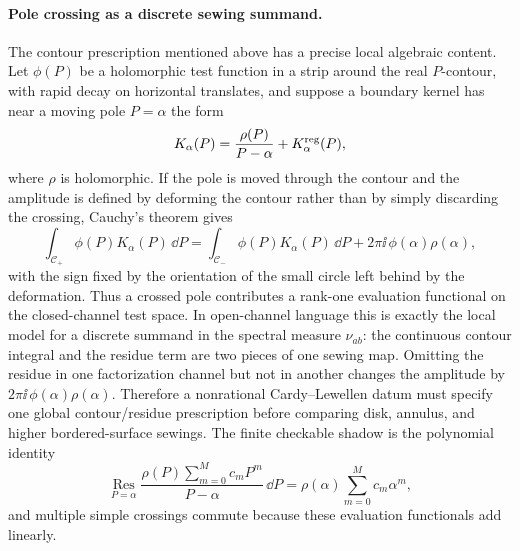 \paragraph{Pole crossing as a discrete sewing summand.}
The contour prescription mentioned above has a precise local algebraic
content.  Let \(\phi(P)\) be a holomorphic test function in a strip around the
real \(P\)-contour, with rapid decay on horizontal translates, and suppose a
boundary kernel has near a moving pole \(P=\alpha\) the form
\[
  K_\alpha(P)
  =
  \frac{\rho(P)}{P-\alpha}+K_\alpha^{\rm reg}(P),
\]
where \(\rho\) is holomorphic.  If the pole is moved through the contour and
the amplitude is defined by deforming the contour rather than by simply
discarding the crossing, Cauchy's theorem gives
\begin{equation}
  \int_{\mathcal C_+}\phi(P)K_\alpha(P)\,\dd P
  =
  \int_{\mathcal C_-}\phi(P)K_\alpha(P)\,\dd P
  +
  2\pi\ii\,\phi(\alpha)\rho(\alpha),
  \label{eq:bcft-pole-crossing-residue-cell}
\end{equation}
with the sign fixed by the orientation of the small circle left behind by the
deformation.  Thus a crossed pole contributes a rank-one evaluation functional
on the closed-channel test space.  In open-channel language this is exactly
the local model for a discrete summand in the spectral measure
\(\nu_{ab}\): the continuous contour integral and the residue term are two
pieces of one sewing map.  Omitting the residue in one factorization channel
but not in another changes the amplitude by
\(2\pi\ii\,\phi(\alpha)\rho(\alpha)\).  Therefore a nonrational Cardy--Lewellen
datum must specify one global contour/residue prescription before comparing
disk, annulus, and higher bordered-surface sewings.  The finite checkable
shadow is the polynomial identity
\[
  \operatorname*{Res}_{P=\alpha}
  \frac{\rho(P)\sum_{m=0}^{M}c_mP^m}{P-\alpha}\,\dd P
  =
  \rho(\alpha)\sum_{m=0}^{M}c_m\alpha^m,
\]
and multiple simple crossings commute because these evaluation functionals add
linearly.

